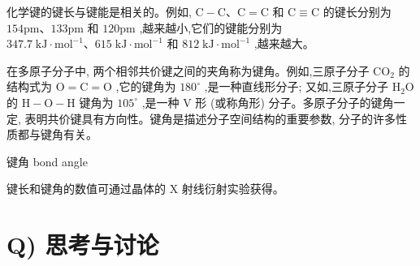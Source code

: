\documentclass[10pt]{article}
\begin{document}
\begin{center}
\end{center}

化学键的键长与键能是相关的。例如, \(\mathrm{C} - \mathrm{C}\text{、}\mathrm{C} = \mathrm{C}\) 和 \(\mathrm{C} \equiv \mathrm{C}\) 的键长分别为 \({154}\mathrm{{pm}}\text{、}{133}\mathrm{{pm}}\) 和 \({120}\mathrm{{pm}}\) ,越来越小,它们的键能分别为 \({347.7}\mathrm{\;{kJ}} \cdot {\mathrm{{mol}}}^{-1}\text{、}{615}\mathrm{\;{kJ}} \cdot {\mathrm{{mol}}}^{-1}\) 和 \({812}\mathrm{\;{kJ}} \cdot {\mathrm{{mol}}}^{-1}\) ,越来越大。

在多原子分子中, 两个相邻共价键之间的夹角称为键角。例如,三原子分子 \({\mathrm{{CO}}}_{2}\) 的结构式为 \(\mathrm{O} = \mathrm{C} = \mathrm{O}\) ,它的键角为 \({180}^{ \circ }\) ,是一种直线形分子; 又如,三原子分子 \({\mathrm{H}}_{2}\mathrm{O}\) 的 \(\mathrm{H} - \mathrm{O} - \mathrm{H}\) 键角为 \({105}^{ \circ }\) ,是一种 \(\mathrm{V}\) 形 (或称角形) 分子。多原子分子的键角一定, 表明共价键具有方向性。键角是描述分子空间结构的重要参数, 分子的许多性质都与键角有关。

\begin{mdframed}

键角 bond angle

\end{mdframed}

键长和键角的数值可通过晶体的 \(\mathrm{X}\) 射线衍射实验获得。

\section*{Q) 思考与讨论}
\end{document}
